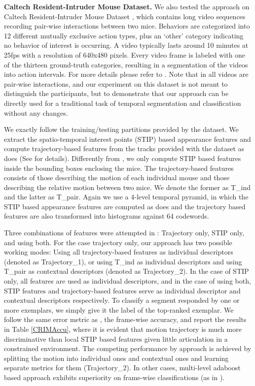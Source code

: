\documentclass[10pt,twocolumn,letterpaper]{article}
\begin{document}
\vspace{0.05in}

\noindent\textbf{Caltech Resident-Intruder Mouse Dataset.} We also tested the approach on Caltech Resident-Intruder Mouse Dataset \cite{CRIM13}, which contains long video sequences recording pair-wise interactions between two mice. Behaviors are categorized into 12 different mutually exclusive action types, plus an `other' category indicating no behavior of interest is occurring. A video typically lasts around 10 minutes at 25fps with a resolution of 640x480 pixels. Every video frame is labeled with one of the thirteen ground-truth categories, resulting in a segmentation of the videos
into action intervals. For more details please refer to \cite{CRIM13}. Note that in all videos are pair-wise interactions, and our experiment on this dataset is not meant to distinguish the participants, but to demonstrate that our approach can be directly used for a traditional task of temporal segmentation and classification without any changes.

We exactly follow the training/testing partitions provided by the dataset. We extract the spatio-temporal interest points (STIP) based appearance features and compute trajectory-based features from the tracks provided with the dataset as \cite{CRIM13} does (See \cite{CRIM13} for details). Differently from \cite{CRIM13}, we only compute STIP based features inside the bounding boxes enclosing the mice. The trajectory-based features consists of those describing the motion of each individual mouse and those describing the relative motion between two mice. We denote the former as T\_ind and the latter as T\_pair. Again we use a 4-level temporal pyramid, in which the STIP based appearance features are computed as \cite{CRIM13} does and the trajectory based features are also transformed into histograms against 64 codewords. 

Three combinations of features were attempted in \cite{CRIM13}: Trajectory only, STIP only, and using both. For the case trajectory only, our approach has two possible working modes: Using all trajectory-based features as individual descriptors (denoted as Trajectory\_1), or using T\_ind as individual descriptors and using T\_pair as contextual descriptors (denoted as Trajectory\_2). In the case of STIP only, all features are used as individual descriptors, and in the case of using both, STIP features and trajectory-based features serve as individual descriptor and contextual descriptors respectively. To classify a segment responded by one or more exemplars, we simply give it the label of the top-ranked exemplar. We follow the same error metric as \cite{CRIM13}, the frame-wise accuracy, and report the results in Table \ref{CRIMAccu}, where it is evident that motion trajectory is much more discriminative than local STIP based features given little articulation in a constrained environment. The competing performance by approach is achieved by splitting the motion into individual ones and contextual ones and learning separate metrics for them (Trajectory\_2). In other cases, multi-level adaboost based approach exhibits superiority on frame-wise classifications (as in \cite{CRIM13}).
\end{document}
